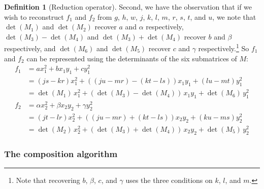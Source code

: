 \documentclass{article}
\theoremstyle{definition}
\newtheorem{definition}{Definition}[section]
\theoremstyle{theorem}
\theoremstyle{example}
\theoremstyle{corollary}
\begin{document}
\begin{definition}[Reduction operator]
Second, we have the observation that if we wish to reconstruct \(f_{1}\) and \(f_{2}\) from \(g\), \(h\), \(w\), \(j\), \(k\), \(l\), \(m\), \(r\), \(s\), \(t\), and \(u\), we note that \(\det(M_{1})\) and \(\det(M_{2})\) recover \(a\) and \(\alpha\) respectively, \(\det(M_{3}) - \det(M_{4})\) and \(\det(M_{3}) + \det(M_{4})\) recover \(b\) and \(\beta\) respectively, and \(\det(M_{6})\) and \(\det(M_{5})\) recover \(c\) and \(\gamma\) respectively.\footnote{Note that recovering \(b\), \(\beta\), \(c\), and \(\gamma\) uses the three conditions on \(k\), \(l\), and \(m\).} So \(f_{1}\) and \(f_{2}\) can be represented using the determinants of the six submatrices of \(M\):
\begin{align*}
f_{1} &= a x_{1}^{2} + b x_{1} y_{1} + c y_{1}^{2} \\
&= (j s - k r) x_{1}^{2} + ( (j u - m r) - (k t - l s) ) x_{1} y_{1} + (l u - m t) y_{1}^{2} \\
&= \det(M_{1})\, x_{1}^{2} + ( \det(M_{3}) - \det(M_{4}) )\, x_{1} y_{1} + \det(M_{6})\, y_{1}^{2} \\
f_{2} &= \alpha x_{2}^{2} + \beta x_{2} y_{2} + \gamma y_{2}^{2} \\
&= (j t - l r) x_{2}^{2} + ( (j u - m r) + (k t - l s) ) x_{2} y_{2} + (k u - m s) y_{2}^{2} \\
&= \det(M_{2})\, x_{2}^{2} + ( \det(M_{3}) + \det(M_{4}) )\, x_{2} y_{2} + \det(M_{5})\, y_{2}^{2}
\end{align*}

\bigskip

\subsubsection{The composition algorithm}

\bigskip


\end{definition}
\end{document}

